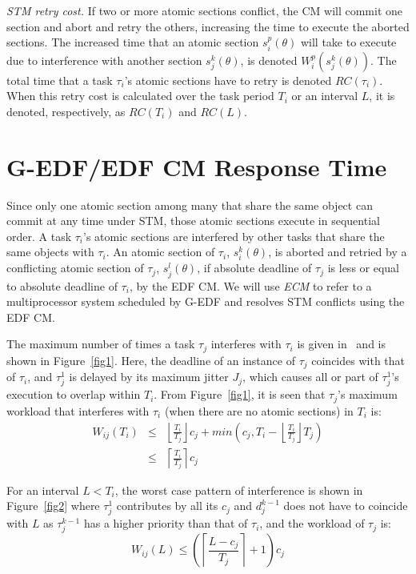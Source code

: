 \documentclass{sig-alternate}
\begin{document}
\textit{STM retry cost.} If two or more atomic sections conflict, the CM will commit one section and abort and retry the others, increasing the time to execute the aborted sections. The increased time that an atomic section $s_i^p (\theta)$ will take to execute due to interference with another section $s_j^k (\theta)$, is denoted $W_{i}^{p}(s_{j}^{k}(\theta))$. The total time that a task $\tau_i$'s atomic sections have to retry is denoted $RC(\tau_i)$.
When this retry cost is calculated over the task period $T_i$ or an interval $L$, it is   denoted, respectively, as $RC(T_i)$ and $RC(L)$.

\section{G-EDF/EDF CM Response Time}
\label{sec:g-edf-edf-cm}

Since only one atomic section among many that share the same object can commit at any time under STM, those atomic sections execute in sequential order.  A task $\tau_{i}$'s atomic sections are interfered by other tasks that share the same objects with $\tau_{i}$. An atomic section of $\tau_i$, $s_i^k(\theta)$, is aborted and retried by a conflicting atomic section of $\tau_j$, $s_j^l(\theta)$, if absolute deadline of $\tau_j$ is less or equal to absolute deadline of $\tau_i$, by the EDF CM. We will use \emph{ECM} to refer to a multiprocessor system scheduled by G-EDF and resolves STM conflicts using the EDF CM. 



The maximum number of times a task $\tau_{j}$ interferes with $\tau_{i}$ is given in~\cite{key-2} and is shown in Figure~\ref{fig1}. 
Here, the deadline of an instance of $\tau_{j}$ coincides
with that of $\tau_{i}$, and $\tau_{j}^{1}$ is delayed by its maximum
jitter $J_{j}$, which causes all or part of $\tau_{j}^1$'s execution to overlap within $T_i$. From Figure~\ref{fig1}, it is seen that $\tau_{j}$'s maximum workload that interferes with $\tau_{i}$ (when there are no atomic sections) in $T_{i}$ is:
\begin{eqnarray}
W_{ij}\left(T_{i}\right) & \le & \left\lfloor\frac{T_{i}}{T_{j}}\right\rfloor c_{j}+min\left(c_{j},T_{i}-\left\lfloor\frac{T_{i}}{T_{j}}\right\rfloor T_{j}\right)\nonumber \\
 & \le & \left\lceil\frac{T_{i}}{T_{j}}\right\rceil c_{j}\label{eq11}\end{eqnarray}

For an interval $L<T_{i}$, the worst case pattern of interference is shown in Figure~\ref{fig2} where $\tau_{j}^{1}$ contributes by all its $c_j$ and $d_j^{k-1}$ does not have to coincide with $L$ as $\tau_j^{k-1}$ has a higher priority than that of $\tau_{i}$, and the workload of $\tau_{j}$ is:
\begin{equation}
W_{ij}\left(L\right)\le \left(\left\lceil\frac{L-c_{j}}{T_{j}}\right\rceil +1\right)c_{j}
\label{eq12}\end{equation}
\end{document}
